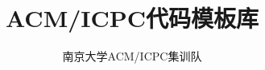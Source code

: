 \documentclass[9pt]{article}
\begin{document}
\title{\Huge \hei \bf ACM/ICPC代码模板库}
\author{南京大学ACM/ICPC集训队}
\date{}

\maketitle

\begin{multicols}{2}
\tableofcontents
\end{multicols}

\newpage

\columnseprule=0.25pt

\begin{multicols}{2}

\end{multicols}
\end{document}
